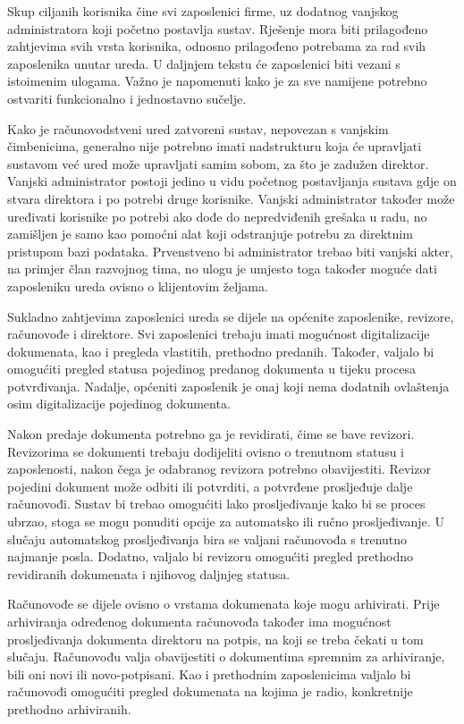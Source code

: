 		\par Skup ciljanih korisnika čine svi zaposlenici firme, uz dodatnog vanjskog administratora koji početno postavlja sustav. Rješenje mora biti prilagođeno zahtjevima svih vrsta korisnika, odnosno prilagođeno potrebama za rad svih zaposlenika unutar ureda. U daljnjem tekstu će zaposlenici biti vezani s istoimenim ulogama. Važno je napomenuti kako je za sve namijene potrebno ostvariti funkcionalno i jednostavno sučelje.
		\par Kako je računovodstveni ured zatvoreni sustav, nepovezan s vanjskim čimbenicima, generalno nije potrebno imati nadstrukturu koja će upravljati sustavom već ured može upravljati samim sobom, za što je zadužen direktor. Vanjski administrator postoji jedino u vidu početnog postavljanja sustava gdje on stvara direktora i po potrebi druge korisnike. Vanjski administrator također može uređivati korisnike po potrebi ako dođe do nepredviđenih grešaka u radu, no zamišljen je samo kao pomoćni alat koji odstranjuje potrebu za direktnim pristupom bazi podataka. Prvenstveno bi administrator trebao biti vanjski akter, na primjer član razvojnog tima, no ulogu je umjesto toga također moguće dati zaposleniku ureda ovisno o klijentovim željama.
		\par Sukladno zahtjevima zaposlenici ureda se dijele na općenite zaposlenike, revizore, računovođe i direktore. Svi zaposlenici trebaju imati mogućnost digitalizacije dokumenata, kao i pregleda vlastitih, prethodno predanih. Također, valjalo bi omogućiti pregled statusa pojedinog predanog dokumenta u tijeku procesa potvrđivanja. Nadalje, općeniti zaposlenik je onaj koji nema dodatnih ovlaštenja osim digitalizacije pojedinog dokumenta.
		\par Nakon predaje dokumenta potrebno ga je revidirati, čime se bave revizori. Revizorima se dokumenti trebaju dodijeliti ovisno o trenutnom statusu i zaposlenosti, nakon čega je odabranog revizora potrebno obavijestiti. Revizor pojedini dokument može odbiti ili potvrditi, a potvrđene prosljeđuje dalje računovođi. Sustav bi trebao omogućiti lako prosljeđivanje kako bi se proces ubrzao, stoga se mogu ponuditi opcije za automatsko ili ručno prosljeđivanje. U slučaju automatskog prosljeđivanja bira se valjani računovođa s trenutno najmanje posla. Dodatno, valjalo bi revizoru omogućiti pregled prethodno revidiranih dokumenata i njihovog daljnjeg statusa.
		\par Računovođe se dijele ovisno o vrstama dokumenata koje mogu arhivirati. Prije arhiviranja određenog dokumenta računovođa također ima mogućnost prosljeđivanja dokumenta direktoru na potpis, na koji se treba čekati u tom slučaju. Računovođu valja obavijestiti o dokumentima spremnim za arhiviranje, bili oni novi ili novo-potpisani. Kao i prethodnim zaposlenicima valjalo bi računovođi omogućiti pregled dokumenata na kojima je radio, konkretnije prethodno arhiviranih.
